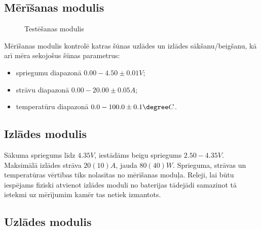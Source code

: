 \documentclass[12pt,fleqn,titlepage,oneside]{article}
\begin{document}
\subsection{Mērīšanas modulis}

\begin{figure}[h]
	\centering
	\caption{Testēšanas modulis}
\end{figure}

Mērīšanas modulis kontrolē katras šūnas uzlādes un izlādes sākšanu/beigšanu, kā arī mēra sekojošus šūnas parametrus:
\begin{itemize}
	\item spriegumu diapazonā $0.00-4.50\pm0.01 V$;
	\item strāvu diapazonā $0.00-20.00\pm0.05 A$;
	\item temperatūru diapazonā $0.0-100.0\pm0.1\degree C$.
\end{itemize}

\subsection{Izlādes modulis}

Sākuma spriegums līdz $4.35V$, iestādāms beigu spriegums $2.50-4.35 V$.
Maksimālā izlādes strāva $20(10) A$, jauda $80(40) W$.
Sprieguma, strāvas un temperatūras vērtības tiks nolasītas no mērīšanas moduļa. 
Releji, lai būtu iespējams fiziski atvienot izlādes moduli no baterijas tādejādi samazinot tā ietekmi uz mērījumim kamēr tas netiek izmantots.

\subsection{Uzlādes modulis}
\end{document}
